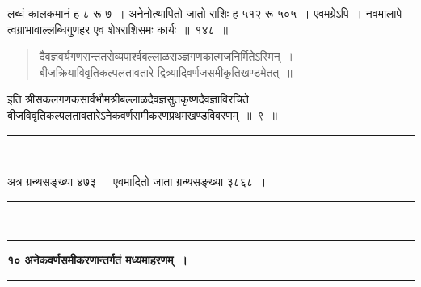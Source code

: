 \documentclass[11pt, openany]{book}
\begin{document}
\newpage

\begin{sloppypar}
\noindent लब्धं कालकमानं ह ८ रू ७~। अनेनोत्थापितो जातो राशिः ह ५१२ रू ५०५~। एवमग्रेऽपि~। नवमालापे त्वग्राभावाल्लब्धिगुणहर एव शेषराशिसमः कार्यः~॥~१४८~॥
\vspace{2mm}

\begin{quote}
{\color{violet}दैवज्ञवर्यगणसन्ततसेव्यपार्श्वबल्लाळसञ्ज्ञगणकात्मजनिर्मितेऽस्मिन्~।\\
बीजक्रियाविवृतिकल्पलतावतारे द्वित्र्यादिवर्णजसमीकृतिखण्डमेतत्~॥}
\end{quote}
\vspace{-4mm}

\begin{center}
इति श्रीसकलगणकसार्वभौमश्रीबल्लाळदैवज्ञसुतकृष्णदैवज्ञाविरचिते\\ बीजविवृतिकल्पलतावतारेऽनेकवर्णसमीकरणप्रथमखण्डविवरणम्~॥~९~॥
\vspace{2mm}

\rule{0.2\linewidth}{0.8pt}\\
\end{center}

अत्र ग्रन्थसङ्ख्या ४७३~। एवमादितो जाता ग्रन्थसङ्ख्या ३८६८~।

\begin{center}
\rule{0.2\linewidth}{0.8pt}\\
\vspace{-4mm}

\rule{0.2\linewidth}{0.8pt}
\end{center}
\end{sloppypar}

\newpage
\thispagestyle{empty}

\begin{center}
\textbf{\large १०\; अनेकवर्णसमीकरणान्तर्गतं मध्यमाहरणम्~।}\\
\rule{0.4\linewidth}{0.8pt}
\end{center}
\end{document}
